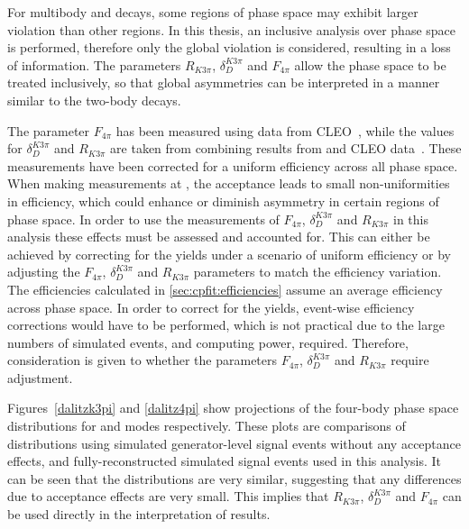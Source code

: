For multibody \decay{\Dz}{\Kmp\pipm\pimp\pipm} and \decay{\Dz}{\pip\pim\pip\pim} decays, some regions of phase space may exhibit larger \CP violation than other regions. In this thesis, an inclusive analysis over phase space is performed, therefore only the global \CP violation is considered, resulting in a loss of information. The parameters $R_{K3\pi}$, $\delta_D^{K3\pi}$ and $F_{4\pi}$ allow the phase space to be treated inclusively, so that global asymmetries can be interpreted in a manner similar to the two-body \Dz decays.

The parameter $F_{4\pi}$ has been measured using data from CLEO~\cite{charm4pi}, while the values for $\delta_D^{K3\pi}$ and $R_{K3\pi}$ are taken from combining results from \lhcb and CLEO data~\cite{charmk3pi,charmk3pi_errata,LHCb-PAPER-2015-057}. These measurements have been corrected for a uniform efficiency across all phase space. When making measurements at \lhcb, the \lhcb acceptance leads to small non-uniformities in efficiency, which could enhance or diminish asymmetry in certain regions of phase space. In order to use the measurements of $F_{4\pi}$, $\delta_D^{K3\pi}$ and $R_{K3\pi}$ in this analysis these effects must be assessed and accounted for. This can either be achieved by correcting for the \lhcb yields under a scenario of uniform efficiency or by adjusting the $F_{4\pi}$, $\delta_D^{K3\pi}$ and $R_{K3\pi}$ parameters to match the \lhcb efficiency variation. The efficiencies calculated in \sect\ref{sec:cpfit:efficiencies} assume an average efficiency across phase space. In order to correct for the \lhcb yields, event-wise efficiency corrections would have to be performed, which is not practical due to the large numbers of simulated events, and computing power, required. Therefore, consideration is given to whether the parameters $F_{4\pi}$, $\delta_D^{K3\pi}$ and $R_{K3\pi}$ require adjustment.

Figures~\ref{dalitzk3pi} and \ref{dalitz4pi} show projections of the four-body phase space distributions for \kpipipi and \pipipipi modes respectively. These plots are comparisons of distributions using simulated generator-level signal events without any acceptance effects, and fully-reconstructed simulated signal events used in this analysis. It can be seen that the distributions are very similar, suggesting that any differences due to \lhcb acceptance effects are very small. This implies that $R_{K3\pi}$, $\delta_D^{K3\pi}$ and $F_{4\pi}$ can be used directly in the interpretation of \lhcb results.

